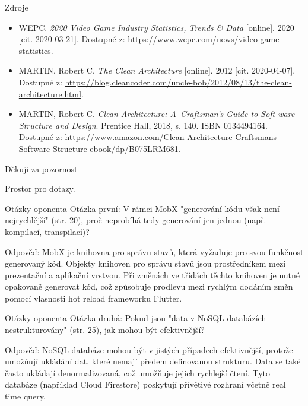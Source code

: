 \documentclass[czech,aspectratio=169]{beamer}
\begin{document}
  \begin{frame}{Zdroje}
    \begin{itemize}
      \item WEPC. \emph{2020 Video Game Industry Statistics, Trends \& Data} [online]. 2020 [cit. 2020-03-21]. Dostupné z: \url{https://www.wepc.com/news/video-game-statistics}.
      \item MARTIN, Robert C. \emph{The Clean Architecture} [online]. 2012 [cit. 2020-04-07]. Dostupné z: \url{https://blog.cleancoder.com/uncle-bob/2012/08/13/the-clean-architecture.html}.
      \item MARTIN, Robert C. \emph{Clean Architecture: A~Craftsman’s Guide to Soft-ware Structure and Design}. Prentice Hall, 2018, s. 140. ISBN 0134494164. Dostupné z: \url{https://www.amazon.com/Clean-Architecture-Craftsmans-Software-Structure-ebook/dp/B075LRM681}. 
    \end{itemize}
  \end{frame}

  \begin{frame}{Děkuji za pozornost}
    \begin{center}
      Prostor pro dotazy.
    \end{center}
  \end{frame}

  \begin{frame}[noframenumbering]{Otázky oponenta}
    Otázka první:
    V rámci MobX "generování kódu však není nejrychlější" (str. 20),
    proč neprobíhá tedy generování jen jednou (např. kompilací, transpilací)?

    \vfill

    Odpověď: MobX je knihovna pro správu stavů,
    která vyžaduje pro svou funkčnost generovaný kód.
    Objekty knihoven pro správu stavů jsou prostředníkem mezi
    prezentační a aplikační vrstvou.
    Při změnách ve třídách těchto knihoven je nutné opakovaně generovat kód,
    což způsobuje prodlevu mezi rychlým dodáním změn pomocí
    vlasnosti hot reload frameworku Flutter.
  \end{frame}

  \begin{frame}[noframenumbering]{Otázky oponenta}
    Otázka druhá:
    Pokud jsou "data v NoSQL databázích nestrukturovány" (str. 25),
    jak mohou být efektivnější?

    \vfill

    Odpověď:
    NoSQL databáze mohou být v jistých případech efektivnější,
    protože umožňují ukládání dat,
    které nemají předem definovanou strukturu.
    Data se také často ukládají denormalizovaná,
    což umožňuje jejich rychlejší čtení.
    Tyto databáze (například Cloud Firestore) poskytují přívětivé rozhraní
    včetně real time query.
  \end{frame}
\end{document}

